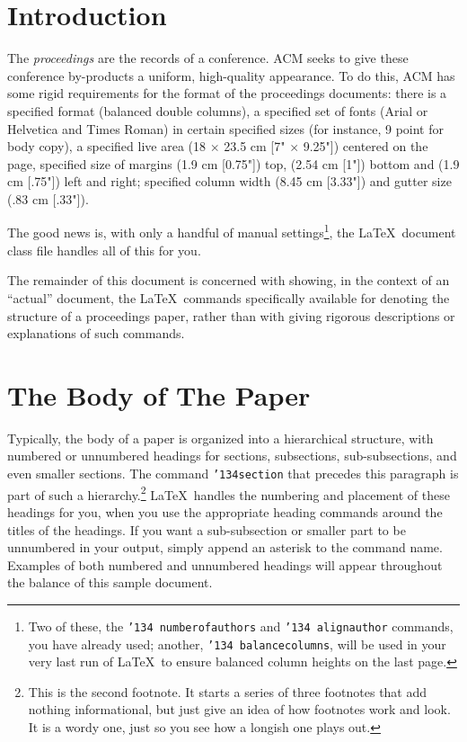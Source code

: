 \documentclass{acm_proc_article-sp}
\begin{document}
\section{Introduction}
The \textit{proceedings} are the records of a conference.
ACM seeks to give these conference by-products a uniform,
high-quality appearance.  To do this, ACM has some rigid
requirements for the format of the proceedings documents: there
is a specified format (balanced  double columns), a specified
set of fonts (Arial or Helvetica and Times Roman) in
certain specified sizes (for instance, 9 point for body copy),
a specified live area (18 $\times$ 23.5 cm [7" $\times$ 9.25"]) centered on
the page, specified size of margins (1.9 cm [0.75"]) top, (2.54 cm [1"]) bottom
and (1.9 cm [.75"]) left and right; specified column width
(8.45 cm [3.33"]) and gutter size (.83 cm [.33"]).

The good news is, with only a handful of manual
settings\footnote{Two of these, the {\texttt{\char'134 numberofauthors}}
and {\texttt{\char'134 alignauthor}} commands, you have
already used; another, {\texttt{\char'134 balancecolumns}}, will
be used in your very last run of \LaTeX\ to ensure
balanced column heights on the last page.}, the \LaTeX\ document
class file handles all of this for you.

The remainder of this document is concerned with showing, in
the context of an ``actual'' document, the \LaTeX\ commands
specifically available for denoting the structure of a
proceedings paper, rather than with giving rigorous descriptions
or explanations of such commands.

\section{The {\secit Body} of The Paper}
Typically, the body of a paper is organized
into a hierarchical structure, with numbered or unnumbered
headings for sections, subsections, sub-subsections, and even
smaller sections.  The command \texttt{{\char'134}section} that
precedes this paragraph is part of such a
hierarchy.\footnote{This is the second footnote.  It
starts a series of three footnotes that add nothing
informational, but just give an idea of how footnotes work
and look. It is a wordy one, just so you see
how a longish one plays out.} \LaTeX\ handles the numbering
and placement of these headings for you, when you use
the appropriate heading commands around the titles
of the headings.  If you want a sub-subsection or
smaller part to be unnumbered in your output, simply append an
asterisk to the command name.  Examples of both
numbered and unnumbered headings will appear throughout the
balance of this sample document.
\end{document}
